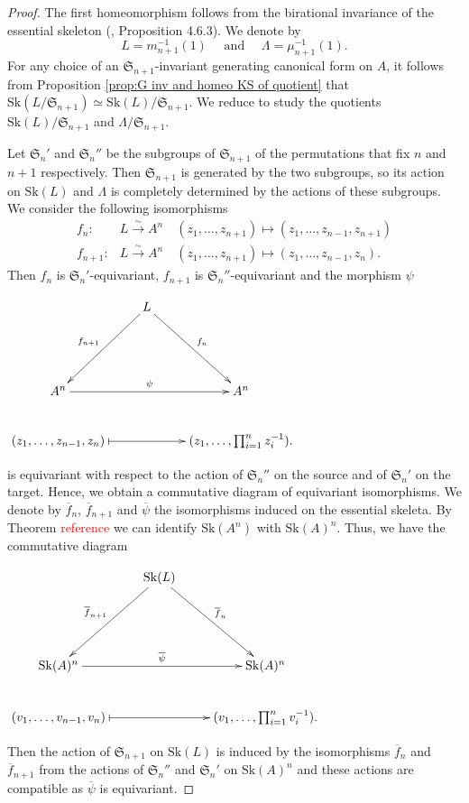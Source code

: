 \documentclass{amsart}%
\numberwithin{equation}{subsection}
\theoremstyle{plain2}
\theoremstyle{definition2}
\theoremstyle{stepstyle}
\theoremstyle{point}
\theoremstyle{subpoint}
\newcommand{\Sk}{\mathrm{Sk}}
\begin{document}
\begin{proof}
The first homeomorphism follows from the birational invariance of the essential skeleton (\cite{MustataNicaise}, Proposition 4.6.3). We denote by $$L=m_{n+1}^{-1}(1) \quad \text{ and }\quad \Lambda=\mu_{n+1}^{-1}(1).$$ For any choice of an $\mathfrak{S}_{n+1}$-invariant generating canonical form on $A$, it follows from Proposition \ref{prop:G inv and homeo KS of quotient} that $\Sk(L/\mathfrak{S}_{n+1}) \simeq \Sk(L)/\mathfrak{S}_{n+1}$. We reduce to study the quotients $\Sk(L)/\mathfrak{S}_{n+1}$ and $\Lambda/\mathfrak{S}_{n+1}$.

Let $\mathfrak{S}_n'$ and $\mathfrak{S}_n''$ be the subgroups of $\mathfrak{S}_{n+1}$ of the permutations that fix $n$ and $n+1$ respectively. Then $\mathfrak{S}_{n+1}$ is generated by the two subgroups, so its action on $\Sk(L)$ and $\Lambda$ is completely determined by the actions of these subgroups. We consider the following isomorphisms 
\begin{align*}
f_n: &L \xrightarrow{\sim} A^n \quad (z_1,\ldots,z_{n+1}) \mapsto (z_1,\ldots,z_{n-1},z_{n+1}) \\
f_{n+1}: &L \xrightarrow{\sim} A^n \quad (z_1,\ldots,z_{n+1}) \mapsto (z_1,\ldots,z_{n-1},z_{n}).
\end{align*} Then $f_n$ is $\mathfrak{S}_n'$-equivariant, $f_{n+1}$ is $\mathfrak{S}_n''$-equivariant and the morphism $\psi$
\begin{center}
\xymatrixrowsep{0.1pc} $\xymatrix{
& L  \ar[ldd]_{f_{n+1}} \ar[ddr]^{f_n} &\\
& & \\
A^n \ar[rr]^{\psi}& & A^n \\
(z_1,\ldots,z_{n-1},z_{n}) \ar@{|->}[rr]& & (z_1,\ldots, \prod_{i=1}^{n} z_i^{-1}).
}$
\end{center} is equivariant with respect to the action of $\mathfrak{S}_n''$ on the source and of $\mathfrak{S}_n'$ on the target. Hence, we obtain a commutative diagram of equivariant isomorphisms. We denote by $\overline{f}_n$, $\overline{f}_{n+1}$ and $\overline{\psi}$ the isomorphisms induced on the essential skeleta. By Theorem \textcolor{red}{reference} we can identify $\Sk(A^n)$ with $\Sk(A)^n$. Thus, we have the commutative diagram
\begin{center}
\xymatrixrowsep{0.1pc} $\xymatrix{
& \Sk(L)  \ar[ldd]_{\overline{f}_{n+1}} \ar[ddr]^{\overline{f}_n} &\\
& & \\
\Sk(A)^n \ar[rr]^{\overline{\psi}}& & \Sk(A)^n \\
(v_1,\ldots,v_{n-1},v_{n}) \ar@{|->}[rr]& & (v_1,\ldots, \prod_{i=1}^{n} v_i^{-1}).
}$
\end{center} Then the action of $\mathfrak{S}_{n+1}$ on $\Sk(L)$ is induced by the isomorphisms $\overline{f}_n$ and $\overline{f}_{n+1}$ from the actions of $\mathfrak{S}_n''$ and $\mathfrak{S}_n'$ on $\Sk(A)^n$ and these actions are compatible as $\overline{\psi}$ is equivariant.


\end{proof}
\end{document}
